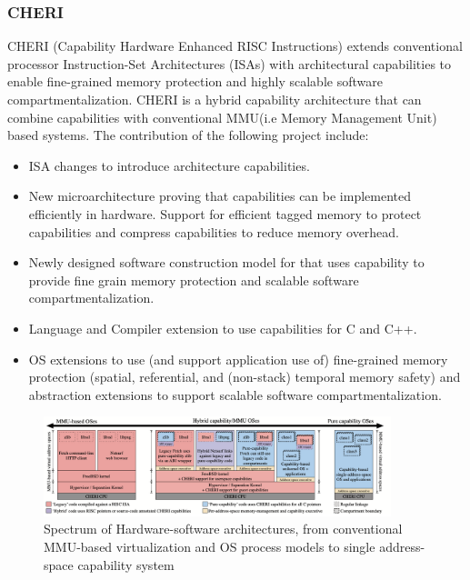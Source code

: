 
\subsubsection{CHERI}
CHERI\cite{CHERI} (Capability Hardware Enhanced RISC Instructions) extends conventional processor
Instruction-Set Architectures (ISAs) with architectural capabilities to enable fine-grained
memory protection and highly scalable software compartmentalization. CHERI is a hybrid 
capability architecture that can combine capabilities with conventional MMU(i.e Memory Management
 Unit) based systems. The contribution of the following project include: 
\begin{itemize}
  \item ISA changes to introduce architecture capabilities.
  \item New microarchitecture proving that capabilities can be implemented efficiently 
        in hardware. Support for efficient tagged memory to protect capabilities and
        compress capabilities to reduce memory overhead.   
  \item Newly designed software construction model for that uses capability to provide
        fine grain memory protection and scalable software compartmentalization.  
  \item Language and Compiler extension to use capabilities for C and C++.
  \item OS extensions to use (and support application use of) fine-grained memory protection
        (spatial, referential, and (non-stack) temporal memory safety) and abstraction extensions
        to support scalable software compartmentalization. 
\end{itemize}

\begin{figure}[htbp!] 
  \centering    
  \includegraphics[width=0.9\textwidth]{Cheri}
  \caption[Cheri]{Spectrum of Hardware-software architectures, from conventional MMU-based virtualization and OS process models to single address-space capability system \cite{CHERI}}
  \label{fig:Cheri}
  \end{figure}
	
